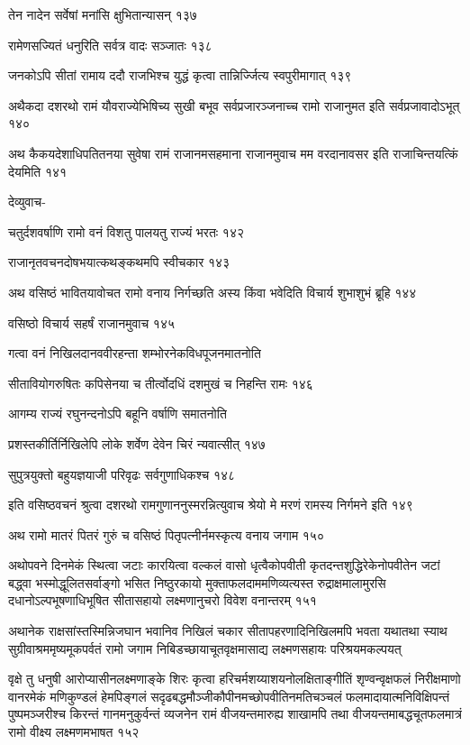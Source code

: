 तेन नादेन सर्वेषां मनांसि क्षुभितान्यासन् १३७

रामेणसज्यितं धनुरिति सर्वत्र वादः सञ्जातः १३८

जनकोऽपि सीतां रामाय ददौ राजभिश्च युद्धं कृत्वा तान्निर्ज्जित्य स्वपुरीमागात् १३९

अथैकदा दशरथो रामं यौवराज्येभिषिच्य सुखी बभूव सर्वप्रजारञ्जनाच्च रामो राजानुमत इति
सर्वप्रजावादोऽभूत् १४०

अथ कैकयदेशाधिपतितनया सुवेषा रामं राजानमसहमाना राजानमुवाच मम वरदानावसर इति
राजाचिन्तयत्किं देयमिति १४१

देव्युवाच-

चतुर्दशवर्षाणि रामो वनं विशतु पालयतु राज्यं भरतः १४२

राजानृतवचनदोषभयात्कथङ्कथमपि स्वीचकार १४३

अथ वसिष्ठं भावितयावोचत रामो वनाय निर्गच्छति अस्य किंवा भवेदिति विचार्य शुभाशुभं
ब्रूहि १४४

वसिष्ठो विचार्य सहर्षं राजानमुवाच १४५

गत्वा वनं निखिलदानववीरहन्ता शम्भोरनेकविधपूजनमातनोति

सीतावियोगरुषितः कपिसेनया च तीर्त्वोदधिं दशमुखं च निहन्ति रामः १४६

आगम्य राज्यं रघुनन्दनोऽपि बहूनि वर्षाणि समातनोति

प्रशस्तकीर्तिर्निखिलेपि लोके शर्वेण देवेन चिरं न्यवात्सीत् १४७

सुपुत्रयुक्तो बहुयज्ञयाजी परिवृढः सर्वगुणाधिकश्च १४८

इति वसिष्ठवचनं श्रुत्वा दशरथो रामगुणाननुस्मरन्नित्युवाच श्रेयो मे मरणं रामस्य निर्गमने इति
 १४९

अथ रामो मातरं पितरं गुरुं च वसिष्ठं पितृपत्नीर्नमस्कृत्य वनाय जगाम १५०

अथोपवने दिनमेकं स्थित्वा जटाः कारयित्वा वल्कलं वासो धृत्वैकोपवीती कृतदन्तशुद्धिरेकेनोपवीतेन
जटां बद्ध्वा भस्मोद्धूलितसर्वाङ्गो भसित निष्ठुरकायो मुक्ताफलदाममणिव्यत्यस्त
रुद्राक्षमालामुरसि दधानोऽल्पभूषणाधिभूषित सीतासहायो लक्ष्मणानुचरो विवेश वनान्तरम् १५१

अथानेक राक्षसांस्तस्मिन्निजघान भवानिव निखिलं चकार सीतापहरणादिनिखिलमपि भवता
यथातथा स्याथ सुग्रीवाश्रममृष्यमूकपर्वतं रामो जगाम निबिडच्छायाचूतवृक्षमासाद्य
लक्ष्मणसहायः परिश्रयमकल्पयत्

वृक्षे तु धनुषी आरोप्यासीनलक्ष्मणाङ्के शिरः कृत्वा हरिचर्मशय्याशयनोलक्षिताङ्गीतिं शृण्वन्वृक्षफलं
निरीक्षमाणो वानरमेकं मणिकुण्डलं हेमपिङ्गलं सदृढबद्धमौञ्जीकौपीनमच्छोपवीतिनमतिचञ्चलं
फलमादायात्मनिविक्षिपन्तं पुष्पमञ्जरीश्च किरन्तं गानमनुकुर्वन्तं व्यजनेन रामं वीजयन्तमारुह्य
शाखामपि तथा वीजयन्तमाबद्धचूतफलमात्रं रामो वीक्ष्य लक्ष्मणमभाषत १५२

